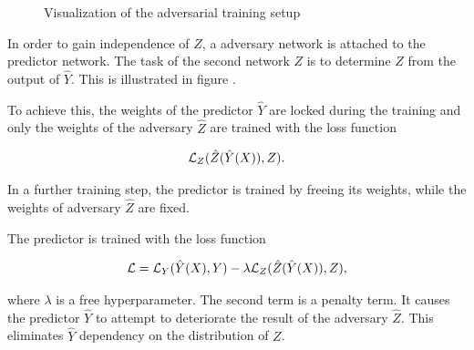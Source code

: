 \documentclass[12pt, a4paper]{thesis}
\begin{document}
\begin{figure}[hbtp]
  \caption{Visualization of the adversarial training setup}
  \label{adv-training}
\end{figure}

In order to gain independence of \(Z\), a adversary network is attached to
the predictor network. The task of the second network \( Z\) is to
determine \(Z\) from the output of \(\hat Y\). This is illustrated in
figure \label{adv-training}.

To achieve this, the weights of the predictor \(\hat Y\) are locked
during the training and only the weights of the adversary \(\hat Z\)
are trained with the loss function

\begin{align}
  {\cal L}_Z(\hat Z(\hat Y(X)), Z).
\end{align}

In a further training step, the predictor is trained by freeing its
weights, while the weights of adversary \(\hat Z\) are fixed.

The predictor is trained with the loss function

\begin{align}
  {\cal L} = {\cal L}_Y(\hat Y(X), Y) - \lambda {\cal L}_Z(\hat Z(\hat Y(X)), Z),
\end{align}

where \(\lambda\) is a free hyperparameter.  The second term is a
penalty term. It causes the predictor \(\hat Y\) to attempt to
deteriorate the result of the adversary \(\hat Z\). This eliminates
\(\hat Y\) dependency on the distribution of \(Z\).
\end{document}

